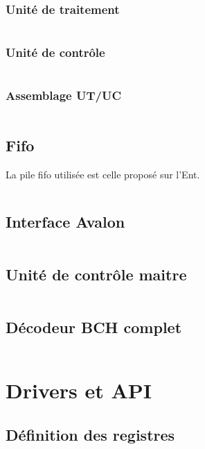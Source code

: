 \documentclass[a4paper, 11pt, svgnames]{report}
\begin{document}
\begin{appendices}
        \subsection{Unité de traitement}
        \inputminted[firstline=0, lastline=61,breaklines]{VHDL}{../src/ut_corr.vhd}
        \subsection{Unité de contrôle}
        \inputminted[firstline=0, lastline=53,breaklines]{VHDL}{../src/uc_corr.vhd}
        \subsection{Assemblage UT/UC}
        \inputminted[firstline=0, lastline=45,breaklines]{VHDL}{../src/corr.vhd}

        \section{Fifo}
        La pile fifo utilisée est celle proposé sur l'Ent.
        \inputminted[firstline=0, lastline=65,breaklines]{VHDL}{../src/fifo.vhd}

        \section{Interface Avalon}
        \label{ann:vhdl_avalon}
        \inputminted[firstline=0, lastline=86,breaklines]{VHDL}{../src/avalon.vhd}

        \section{Unité de contrôle maitre}
        \label{ann:vhdl_master}
        \inputminted[firstline=0, lastline=90,breaklines]{VHDL}{../src/uc_master.vhd}

        \section{Décodeur BCH complet}
        \label{ann:vhdl_bch}
        \inputminted[firstline=0, lastline=113,breaklines]{VHDL}{../src/bch.vhd}

        \chapter{Drivers et API}

        \section{Définition des registres}
        \inputminted[breaklines]{C}{../quartus/ip/BCH/inc/BCH_regs.h}


\end{appendices}
\end{document}
